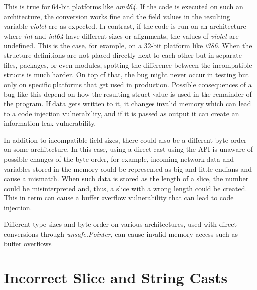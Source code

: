 

This is true for 64-bit platforms like \textit{amd64}.
If the code is executed on such an architecture, the conversion works fine and the field values in the resulting variable
\textit{violet} are as expected.
In contrast, if the code is run on an architecture where \textit{int} and \textit{int64} have different sizes or
alignments, the values of \textit{violet} are undefined.
This is the case, for example, on a 32-bit platform like \textit{i386}.
When the structure definitions are not placed directly next to each other but in separate files, packages, or even
modules, spotting the difference between the incompatible structs is much harder.
On top of that, the bug might never occur in testing but only on specific platforms that get used in production.
Possible consequences of a bug like this depend on how the resulting struct value is used in the remainder of the
program.
If data gets written to it, it changes invalid memory which can lead to a code injection vulnerability, and if it is
passed as output it can create an information leak vulnerability.

In addition to incompatible field sizes, there could also be a different byte order on some architecture.
In this case, using a direct cast using the \unsafe{} \acrshort{API} is unaware of possible changes of the byte order,
for example, incoming network data and variables stored in the memory could be represented as big and little endians and
cause a mismatch.
When such data is stored as the length of a slice, the number could be misinterpreted and, thus, a slice with a wrong
length could be created.
This in term can cause a buffer overflow vulnerability that can lead to code injection.

\begin{insight}
    Different type sizes and byte order on various architectures, used with direct conversions through
    \textit{unsafe.Pointer}, can cause invalid memory access such as buffer overflows.
\end{insight}



\section{Incorrect Slice and String Casts}\label{sec:unsafe-security-problems:slice-casts}

